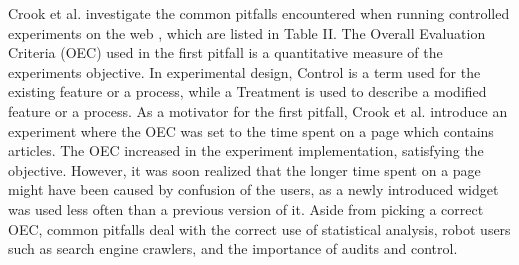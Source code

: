\documentclass[english]{tktltiki2}
\theoremstyle{definition}
\theoremstyle{remark}
\begin{document}
Crook et al. investigate the common pitfalls encountered when running controlled experiments on the web \cite{crook2009seven}, which are listed in Table II. The Overall Evaluation Criteria (OEC) used in the first pitfall is a quantitative measure of the experiments objective. In experimental design, Control is a term used for the existing feature or a process, while a Treatment is used to describe a modified feature or a process. As a motivator for the first pitfall, Crook et al. introduce an experiment where the OEC was set to the time spent on a page which contains articles. The OEC increased in the experiment implementation, satisfying the objective. However, it was soon realized that the longer time spent on a page might have been caused by confusion of the users, as a newly introduced widget was used less often than a previous version of it. Aside from picking a correct OEC, common pitfalls deal with the correct use of statistical analysis, robot users such as search engine crawlers, and the importance of audits and control.
\end{document}
